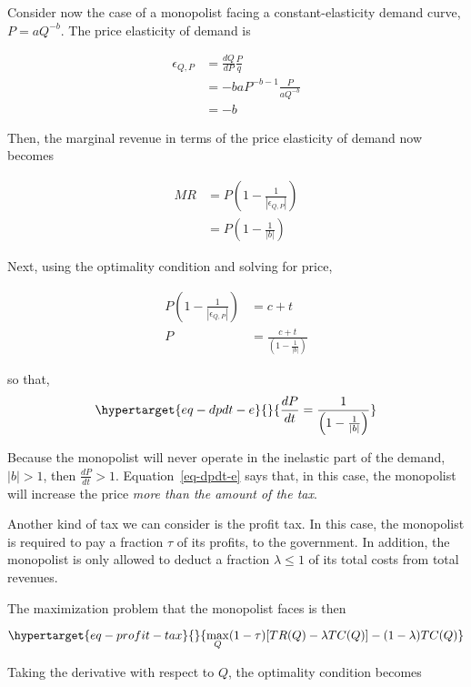 \documentclass[
]{article}
\begin{document}
Consider now the case of a monopolist facing a constant-elasticity
demand curve, \(P=aQ^{-b}\). The price elasticity of demand is

\[
\begin{aligned}
\epsilon_{Q,P}&=\frac{dQ}{dP}\frac{P}{q}\\
    &=-baP^{-b-1}\frac{P}{aQ^{-b}}\\
    &=-b
\end{aligned}
\]

Then, the marginal revenue in terms of the price elasticity of demand
now becomes

\[
\begin{aligned}
MR&=P\left(1-\frac{1}{ |\epsilon_{Q,P}| }\right)\\
    &=P\left(1-\frac{1}{ |b| }\right)
\end{aligned}
\]

Next, using the optimality condition and solving for price,

\[
\begin{aligned}
P\left(1-\frac{1}{ |\epsilon_{Q,P}| }\right)&=c+t\\
    P&=\frac{c+t}{\left(1-\frac{1}{ |b| }\right)}
\end{aligned}
\]

so that, \begin{equation}\protect\hypertarget{eq-dpdt-e}{}{
\frac{dP}{dt}=\frac{1}{\left(1-\frac{1}{ |b| }\right)}
}\label{eq-dpdt-e}\end{equation}

Because the monopolist will never operate in the inelastic part of the
demand, \(|b| >1\), then \(\frac{dP}{dt}> 1\). Equation~\ref{eq-dpdt-e}
says that, in this case, the monopolist will increase the price
\emph{more than the amount of the tax}.

Another kind of tax we can consider is the profit tax. In this case, the
monopolist is required to pay a fraction \(\tau\) of its profits, to the
government. In addition, the monopolist is only allowed to deduct a
fraction \(\lambda\le1\) of its total costs from total revenues.

The maximization problem that the monopolist faces is then

\begin{equation}\protect\hypertarget{eq-profit-tax}{}{
\max_{Q} (1-\tau)[TR(Q)-\lambda TC(Q)] - (1-\lambda) TC(Q)
}\label{eq-profit-tax}\end{equation}

Taking the derivative with respect to \(Q\), the optimality condition
becomes
\end{document}
